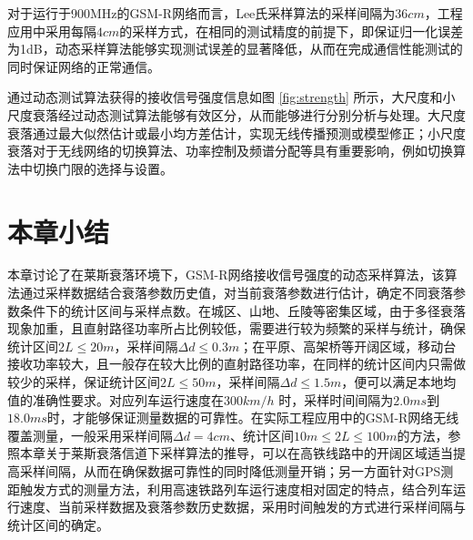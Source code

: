 \begin{figure}[!htp]
\centering
\hspace{1in}
\centering
\end{figure}

对于运行于900MHz的GSM-R网络而言，Lee氏采样算法的采样间隔为$36cm$，工程应用中采用每隔$4cm$的采样方式，在相同的测试精度的前提下，即保证归一化误差为1dB，动态采样算法能够实现测试误差的显著降低，从而在完成通信性能测试的同时保证网络的正常通信。

通过动态测试算法获得的接收信号强度信息如图 \ref{fig:strength} 所示，大尺度和小尺度衰落经过动态测试算法能够有效区分，从而能够进行分别分析与处理。大尺度衰落通过最大似然估计或最小均方差估计，实现无线传播预测或模型修正；小尺度衰落对于无线网络的切换算法、功率控制及频谱分配等具有重要影响，例如切换算法中切换门限的选择与设置。

\section{本章小结}
\label{sec:conclusion2}

本章讨论了在莱斯衰落环境下，GSM-R网络接收信号强度的动态采样算法，该算法通过采样数据结合衰落参数历史值，对当前衰落参数进行估计，确定不同衰落参数条件下的统计区间与采样点数。在城区、山地、丘陵等密集区域，由于多径衰落现象加重，且直射路径功率所占比例较低，需要进行较为频繁的采样与统计，确保统计区间$2L \leq 20m$，采样间隔$\Delta d \leq 0.3m$；在平原、高架桥等开阔区域，移动台接收功率较大，且一般存在较大比例的直射路径功率，在同样的统计区间内只需做较少的采样，保证统计区间$2L \leq 50m$，采样间隔$\Delta d \leq 1.5m$，便可以满足本地均值的准确性要求。对应列车运行速度在$300km/h$ 时，采样时间间隔为$2.0ms$到$18.0ms$时，才能够保证测量数据的可靠性。在实际工程应用中的GSM-R网络无线覆盖测量，一般采用采样间隔$\Delta d = 4cm$、统计区间$10m \leq 2L \leq 100m$的方法，参照本章关于莱斯衰落信道下采样算法的推导，可以在高铁线路中的开阔区域适当提高采样间隔，从而在确保数据可靠性的同时降低测量开销；另一方面针对GPS测距触发方式的测量方法，利用高速铁路列车运行速度相对固定的特点，结合列车运行速度、当前采样数据及衰落参数历史数据，采用时间触发的方式进行采样间隔与统计区间的确定。

\nocite{4536668,PrietoGMVA08,flammini2009quantitative,4299714,wubben2011lattice}
\nocite{tepedelenlio?lu2001estimation}
\nocite{gopal2009power}
\nocite{goldsmith1994error}
\nocite{aja2008restoration}
\nocite{saleh1987statistical}
\nocite{sijbers1998maximum}\nocite{devore2000atr}\nocite{mousa2010estimation}